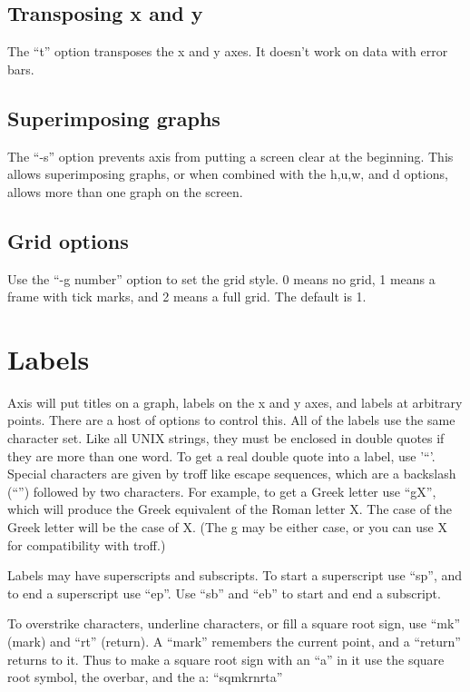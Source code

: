 \subsection{Transposing x and y}
The ``t'' option transposes the x and y axes.  It doesn't work on
data with error bars.

\subsection{Superimposing graphs}
The ``-s'' option prevents axis from putting a screen clear at the
beginning.
This allows superimposing graphs, or when combined with the h,u,w, and
d options, allows more than one graph on the screen.

\subsection{Grid options}
Use the ``-g number'' option to set the grid style. 0 means no grid,
1 means a frame with tick marks, and 2 means a full grid.  The default
is 1.

\section{Labels} \label{Labels}
Axis will put titles on a graph, labels on the x and y axes, and
labels at arbitrary points.  There are a host of options to control
this.  All of the labels use the same character set.  Like all UNIX
strings, they must be enclosed in double quotes if they are more than
one word.  To get a real double quote into a label, use '\bs ``'.
Special characters are given by troff like escape sequences, which are
a backslash (``\bs '') followed by two characters.  For example, to
get a Greek letter use ``\bs gX'', which will produce the Greek equivalent
of the Roman letter X.  The case of the Greek letter will be the case
of X.  (The g may be either case, or you can use \bs *X for compatibility
with troff.)

Labels may have superscripts and subscripts.  To start a superscript
use ``\bs sp'', and to end a superscript use ``\bs ep''.  Use ``\bs sb'' and ``\bs eb''
to start and end a subscript.

To overstrike characters, underline characters, or fill a square root
sign, use ``\bs mk'' (mark) and ``\bs rt'' (return).  A ``mark'' remembers the
current point, and a ``return'' returns to it.  Thus to make a square
root sign with an ``a'' in it use the square root symbol, the overbar,
and the a: ``\bs sq\bs mk\bs rn\bs rta''

